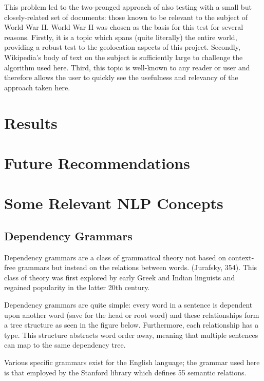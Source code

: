 \documentclass[11pt]{article}
\begin{document}
This problem led to the two-pronged approach of also testing with a small but closely-related set of documents: those known to be relevant to the subject of World War II.  World War II was chosen as the basis for this test for several reasons.  Firstly, it is a topic which spans (quite literally) the entire world, providing a robust test to the geolocation aspects of this project.  Secondly, Wikipedia's body of text on the subject is sufficiently large to challenge the algorithm used here.  Third, this topic is well-known to any reader or user and therefore allows the user to quickly see the usefulness and relevancy of the approach taken here.



\section{Results}

\section{Future Recommendations} 

\appendix

\section{Some Relevant NLP Concepts}

\subsection{Dependency Grammars}     

Dependency grammars are a class of grammatical theory not based on context-free grammars but instead on the relations between words.  (Jurafsky, 354).  This class of theory was first explored by early Greek and Indian linguists and regained popularity in the latter 20th century.  

Dependency grammars are quite simple: every word in a sentence is dependent upon another word (save for the head or root word) and these relationships form a tree structure as seen in the figure below.  Furthermore, each relationship has a type.  This structure abstracts word order away, meaning that multiple sentences can map to the same dependency tree.

Various specific grammars exist for the English language; the grammar used here is that employed by the Stanford library which defines 55 semantic relations.
\end{document}
